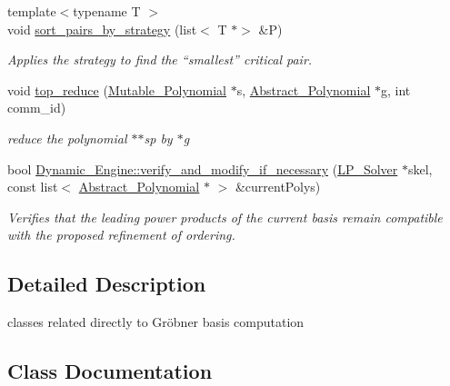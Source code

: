 \begin{DoxyCompactItemize}
{\footnotesize template$<$typename T $>$ }\\void \hyperlink{group___g_b_computation_ga428f97f3978ba1eb759b8381a523dfe7}{sort\+\_\+pairs\+\_\+by\+\_\+strategy} (list$<$ T $\ast$$>$ \&P)
\begin{DoxyCompactList}\small\item\em Applies the strategy to find the ``smallest'' critical pair. \end{DoxyCompactList}\item 
void \hyperlink{group___g_b_computation_ga459782e1aa0e3b2b4a6569bcd27150cc}{top\+\_\+reduce} (\hyperlink{group__polygroup_class_mutable___polynomial}{Mutable\+\_\+\+Polynomial} $\ast$s, \hyperlink{group__polygroup_class_abstract___polynomial}{Abstract\+\_\+\+Polynomial} $\ast$g, int comm\+\_\+id)
\begin{DoxyCompactList}\small\item\em reduce the polynomial {\ttfamily $\ast$$\ast$sp} by {\ttfamily $\ast$g} \end{DoxyCompactList}\item 
bool \hyperlink{group___g_b_computation_gaf3c21c23093fae5467dd770f790540f6}{Dynamic\+\_\+\+Engine\+::verify\+\_\+and\+\_\+modify\+\_\+if\+\_\+necessary} (\hyperlink{group___c_l_s_solvers_class_l_p___solvers_1_1_l_p___solver}{L\+P\+\_\+\+Solver} $\ast$skel, const list$<$ \hyperlink{group__polygroup_class_abstract___polynomial}{Abstract\+\_\+\+Polynomial} $\ast$ $>$ \&current\+Polys)
\begin{DoxyCompactList}\small\item\em Verifies that the leading power products of the current basis remain compatible with the proposed refinement of ordering. \end{DoxyCompactList}\end{DoxyCompactItemize}


\subsection{Detailed Description}
classes related directly to Gr\"{o}bner basis computation 



\subsection{Class Documentation}
\label{class_critical___pair___basic}
